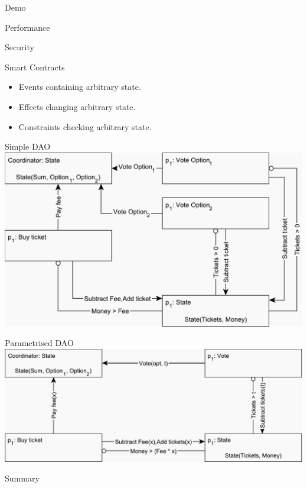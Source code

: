 \documentclass{beamer}
\begin{document}
\begin{frame}{Demo}%
    
\end{frame}

\begin{frame}{Performance}%
    
\end{frame}

\begin{frame}{Security}%
    
\end{frame}

\begin{frame}{Smart Contracts}%
    \begin{itemize}
    	\item Events containing arbitrary state.
    	\item Effects changing arbitrary state.
    	\item Constraints checking arbitrary state.
    \end{itemize}
\end{frame}

\begin{frame}{Simple DAO}
	\centering
	\includegraphics[scale=0.5]{figures/dao-simple.pdf}
\end{frame}

\begin{frame}{Parametrised DAO}
	\centering
	\includegraphics[scale=0.5]{figures/dao-parametrised.pdf}	
\end{frame}

\begin{frame}{Summary}%
    
\end{frame}
\end{document}
